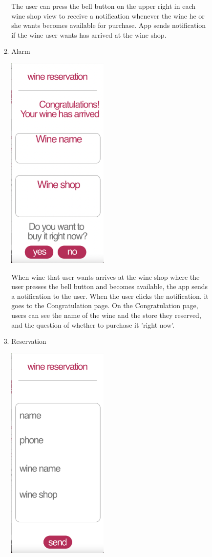 \documentclass[conference]{IEEEtran}
\numberwithin{figure}{subsection}
\begin{document}
\begin{enumerate}
\begin{enumerate}
\begin{enumerate}
\begin{enumerate}
                The user can press the bell button on the upper right in each wine shop view to receive a notification whenever the wine he or she wants becomes available for purchase. App sends notification if the wine user wants has arrived at the wine shop.
                \item Alarm\\
                \centerline{\includegraphics[width=5cm]{winearrive.png}}
                When wine that user wants arrives at the wine shop where the user presses the bell button and becomes available, the app sends a notification to the user. When the user clicks the notification, it goes to the Congratulation page. On the Congratulation page, users can see the name of the wine and the store they reserved, and the question of whether to purchase it 'right now'.
                \item Reservation\\
                \centerline{\includegraphics[width=5cm]{winebuy.png}}

\end{enumerate}
\end{enumerate}
\end{enumerate}
\end{enumerate}
\end{document}
